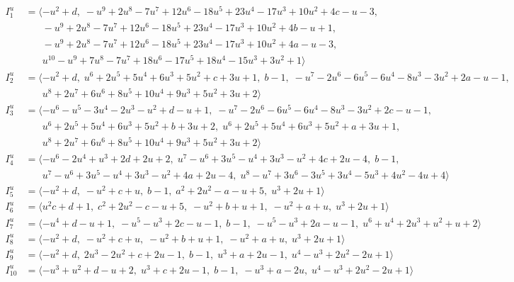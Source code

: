 \documentclass[1p]{elsarticle_modified}
\theoremstyle{definition}
\begin{document}
\begin{align*}
I^u_{1}&=\langle 
- u^2+d,\;- u^9+2 u^8-7 u^7+12 u^6-18 u^5+23 u^4-17 u^3+10 u^2+4 c- u-3,\\
\phantom{I^u_{1}}&\phantom{= \langle  }- u^9+2 u^8-7 u^7+12 u^6-18 u^5+23 u^4-17 u^3+10 u^2+4 b- u+1,\\
\phantom{I^u_{1}}&\phantom{= \langle  }- u^9+2 u^8-7 u^7+12 u^6-18 u^5+23 u^4-17 u^3+10 u^2+4 a- u-3,\\
\phantom{I^u_{1}}&\phantom{= \langle  }u^{10}- u^9+7 u^8-7 u^7+18 u^6-17 u^5+18 u^4-15 u^3+3 u^2+1\rangle \\
I^u_{2}&=\langle 
- u^2+d,\;u^6+2 u^5+5 u^4+6 u^3+5 u^2+c+3 u+1,\;b-1,\;- u^7-2 u^6-6 u^5-6 u^4-8 u^3-3 u^2+2 a- u-1,\\
\phantom{I^u_{2}}&\phantom{= \langle  }u^8+2 u^7+6 u^6+8 u^5+10 u^4+9 u^3+5 u^2+3 u+2\rangle \\
I^u_{3}&=\langle 
- u^6- u^5-3 u^4-2 u^3- u^2+d- u+1,\;- u^7-2 u^6-6 u^5-6 u^4-8 u^3-3 u^2+2 c- u-1,\\
\phantom{I^u_{3}}&\phantom{= \langle  }u^6+2 u^5+5 u^4+6 u^3+5 u^2+b+3 u+2,\;u^6+2 u^5+5 u^4+6 u^3+5 u^2+a+3 u+1,\\
\phantom{I^u_{3}}&\phantom{= \langle  }u^8+2 u^7+6 u^6+8 u^5+10 u^4+9 u^3+5 u^2+3 u+2\rangle \\
I^u_{4}&=\langle 
- u^6-2 u^4+u^3+2 d+2 u+2,\;u^7- u^6+3 u^5- u^4+3 u^3- u^2+4 c+2 u-4,\;b-1,\\
\phantom{I^u_{4}}&\phantom{= \langle  }u^7- u^6+3 u^5- u^4+3 u^3- u^2+4 a+2 u-4,\;u^8- u^7+3 u^6-3 u^5+3 u^4-5 u^3+4 u^2-4 u+4\rangle \\
I^u_{5}&=\langle 
- u^2+d,\;- u^2+c+u,\;b-1,\;a^2+2 u^2- a- u+5,\;u^3+2 u+1\rangle \\
I^u_{6}&=\langle 
u^2 c+d+1,\;c^2+2 u^2- c- u+5,\;- u^2+b+u+1,\;- u^2+a+u,\;u^3+2 u+1\rangle \\
I^u_{7}&=\langle 
- u^4+d- u+1,\;- u^5- u^3+2 c- u-1,\;b-1,\;- u^5- u^3+2 a- u-1,\;u^6+u^4+2 u^3+u^2+u+2\rangle \\
I^u_{8}&=\langle 
- u^2+d,\;- u^2+c+u,\;- u^2+b+u+1,\;- u^2+a+u,\;u^3+2 u+1\rangle \\
I^u_{9}&=\langle 
- u^2+d,\;2 u^3-2 u^2+c+2 u-1,\;b-1,\;u^3+a+2 u-1,\;u^4- u^3+2 u^2-2 u+1\rangle \\
I^u_{10}&=\langle 
- u^3+u^2+d- u+2,\;u^3+c+2 u-1,\;b-1,\;- u^3+a-2 u,\;u^4- u^3+2 u^2-2 u+1\rangle \\
\end{align*}\\
\end{document}
